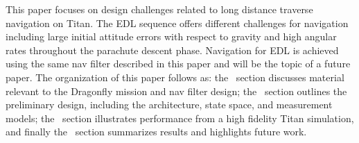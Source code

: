 This paper focuses on design challenges related to long distance traverse navigation on Titan. The \ac{EDL} sequence offers different challenges for navigation including large initial attitude errors with respect to gravity and high angular rates throughout the parachute descent phase. Navigation for \ac{EDL} is achieved using the same nav filter described in this paper and will be the topic of a future paper. The organization of this paper follows as: the~ section discusses material relevant to the Dragonfly mission and nav filter design; the~ section outlines the preliminary design, including the architecture, state space, and measurement models; the~ section illustrates performance from a high fidelity Titan simulation, and finally the~ section summarizes results and highlights future work.
